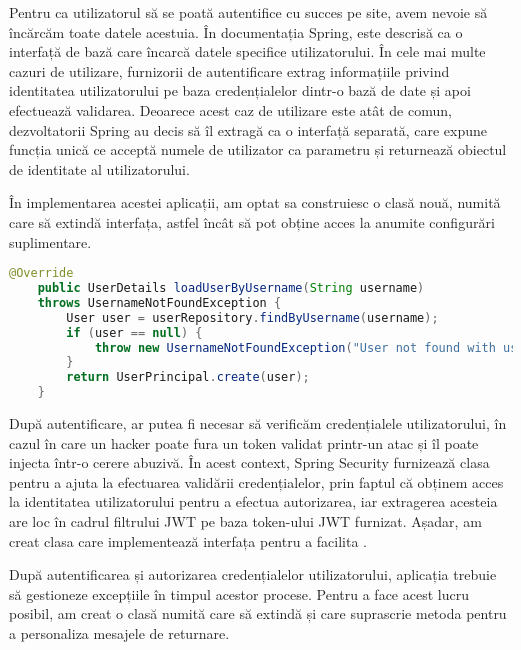 Pentru ca utilizatorul să se poată autentifice cu succes pe site, avem nevoie să încărcăm toate datele acestuia. În documentația Spring,\newline {} este descrisă ca o interfață de bază care încarcă datele specifice utilizatorului. În cele mai multe cazuri de utilizare, furnizorii de autentificare extrag informațiile privind identitatea utilizatorului pe baza credențialelor dintr-o bază de date și apoi efectuează validarea. Deoarece acest caz de utilizare este atât de comun, dezvoltatorii Spring au decis să îl extragă ca o interfață separată, care expune funcția unică  ce acceptă numele de utilizator ca parametru și returnează obiectul de identitate al utilizatorului.\newline

În implementarea acestei aplicații, am optat sa construiesc o clasă nouă, numită  care să extindă interfața\newline {}, astfel încât să pot obține acces la anumite configurări suplimentare.\newline

 \begin{lstlisting}[language=Java]
	@Override
	public UserDetails loadUserByUsername(String username)
	throws UsernameNotFoundException {
		User user = userRepository.findByUsername(username);
		if (user == null) {
			throw new UsernameNotFoundException("User not found with username: " + username);
		}
		return UserPrincipal.create(user);
	}
\end{lstlisting}
\bigskip

După autentificare, ar putea fi necesar să verificăm credențialele utilizatorului, în cazul în care un hacker poate fura un token validat printr-un atac și îl poate injecta într-o cerere abuzivă. În acest context, Spring Security furnizează clasa  pentru a ajuta la efectuarea validării credențialelor, prin faptul că obținem acces la identitatea utilizatorului pentru a efectua autorizarea, iar extragerea acesteia are loc în cadrul filtrului JWT pe baza token-ului JWT furnizat.\newline
Așadar, am creat clasa  care implementează interfața  pentru a facilita .\newline

După autentificarea și autorizarea credențialelor utilizatorului, aplicația trebuie să gestioneze excepțiile în timpul acestor procese. Pentru a face acest lucru posibil, am creat o clasă numită   care să extindă  și care suprascrie metoda  pentru a personaliza mesajele de returnare.\newline

